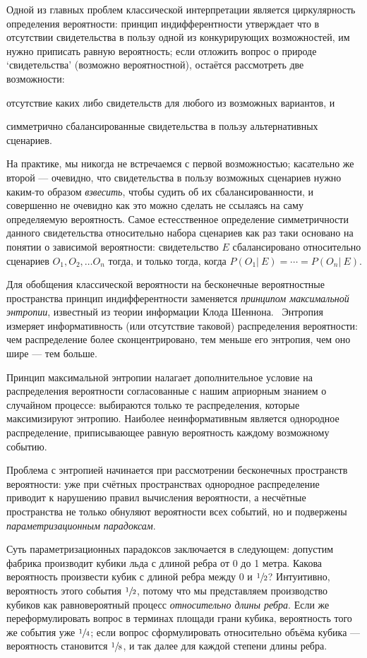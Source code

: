 \documentclass[14pt]{extarticle}
\begin{document}
Одной из главных проблем классической интерпретации является циркулярность определения вероятности: принцип индифферентности утверждает что в отсутствии свидетельства в пользу одной из конкурирующих возможностей, им нужно приписать равную вероятность; если отложить вопрос о природе `свидетельства' (возможно вероятностной), остаётся рассмотреть две возможности:
\begin{inparaenum}[1)]
\item отсутствие каких либо свидетельств для любого из возможных вариантов, и
\item симметрично сбалансированные свидетельства в пользу альтернативных сценариев.
\end{inparaenum}
На практике, мы никогда не встречаемся с первой возможностью; касательно же второй --- очевидно, что свидетельства в пользу возможных сценариев нужно каким-то образом \emph{взвесить}, чтобы судить об их сбалансированности, и совершенно не очевидно как это можно сделать не ссылаясь на саму определяемую вероятность. Самое естесственное определение симметричности данного свидетельства относительно набора сценариев как раз таки основано на понятии о зависимой вероятности: свидетельство $E$ сбалансировано относительно сценариев $O_1, O_2,\dots O_n$  тогда, и только тогда, когда $P(O_1|~ E) = \cdots = P(O_n|~ E)$.

Для обобщения классической вероятности на бесконечные вероятностные пространства принцип индифферентности заменяется \emph{принципом максимальной энтропии}, известный из теории информации Клода Шеннона.~\cite{Shannon} Энтропия измеряет информативность (или отсутствие таковой) распределения вероятности: чем распределение более сконцентрировано, тем меньше его энтропия, чем оно шире --- тем больше. 

Принцип максимальной энтропии налагает дополнительное условие на распределения вероятности согласованные с нашим априорным знанием о случайном процессе: выбираются только те распределения, которые максимизируют энтропию. Наиболее неинформативным является однородное распределение, приписывающее равную вероятность каждому возможному событию.

Проблема с энтропией начинается при рассмотрении бесконечных пространств вероятности: уже при счётных пространствах однородное распределение приводит к нарушению правил вычисления вероятности, а несчётные пространства не только обнуляют вероятности всех событий, но и подвержены \emph{параметризационным парадоксам}.

Суть параметризационных парадоксов заключается в следующем: допустим фабрика производит кубики льда с длиной ребра от 0 до 1 метра. Какова вероятность произвести кубик с длиной ребра между 0 и $\sfrac12$? Интуитивно, вероятность этого события $\sfrac12$, потому что мы представляем производство кубиков как равновероятный процесс \emph{относительно длины ребра}. Если же переформулировать вопрос в терминах площади грани кубика, вероятность того же события уже $\sfrac14$; если вопрос сформулировать относительно объёма кубика --- вероятность становится $\sfrac18$, и так далее для каждой степени длины ребра. 
\end{document}
